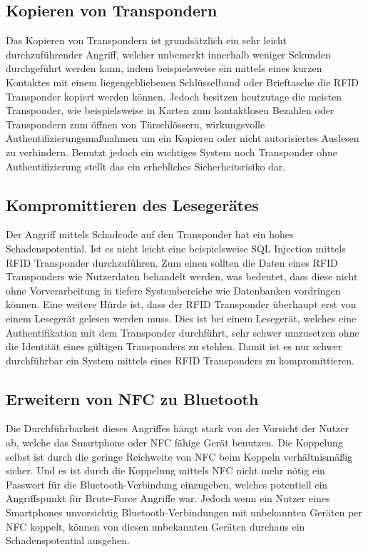 \documentclass[conference]{IEEEtran}
\begin{document}
\subsection{Kopieren von Transpondern}
Das Kopieren von Transpondern ist grundsätzlich ein sehr leicht durchzuführender Angriff, welcher unbemerkt innerhalb weniger Sekunden durchgeführt werden kann, indem beispielsweise ein mittels eines kurzen Kontaktes mit einem liegengebliebenen Schlüsselbund oder Brieftasche die RFID Transponder kopiert werden können. Jedoch besitzen heutzutage die meisten Transponder, wie beispielsweise in Karten zum kontaktlosen Bezahlen oder Transpondern zum öffnen von Türschlössern, wirkungsvolle Authentifizierungsmaßnahmen um ein Kopieren oder nicht autorisiertes Auslesen zu verhindern. Benutzt jedoch ein wichtiges System noch Transponder ohne Authentifizierung stellt das ein erhebliches Sicherheitsrisiko dar.

\subsection{Kompromittieren des Lesegerätes}
Der Angriff mittels Schadcode auf den Transponder hat ein hohes Schadenspotential. Ist es nicht leicht eine beispielsweise SQL Injection mittels RFID Transponder durchzuführen. Zum einen sollten die Daten eines RFID Transponders wie Nutzerdaten behandelt werden, was bedeutet, dass diese nicht ohne Vorverarbeitung in tiefere Systembereiche wie Datenbanken vordringen können. Eine weitere Hürde ist, dass der RFID Transponder überhaupt erst von einem Lesegerät gelesen werden muss. Dies ist bei einem Lesegerät, welches eine Authentifikation mit dem Transponder durchführt, sehr schwer umzusetzen ohne die Identität eines gültigen Transponders zu stehlen. Damit ist es nur schwer durchführbar ein System mittels eines RFID Transponders zu kompromittieren.

\subsection{Erweitern von NFC zu Bluetooth}
Die Durchführbarkeit dieses Angriffes hängt stark von der Vorsicht der Nutzer ab, welche das Smartphone oder NFC fähige Gerät benutzen. Die Koppelung selbst ist durch die geringe Reichweite von NFC beim Koppeln verhältnismäßig sicher. Und es ist durch die Koppelung mittels NFC nicht mehr nötig ein Passwort für die Bluetooth-Verbindung einzugeben, welches potentiell ein Angriffspunkt für Brute-Force Angriffe war. Jedoch wenn ein Nutzer eines Smartphones unvorsichtig Bluetooth-Verbindungen mit unbekannten Geräten per NFC koppelt, können von diesen unbekannten Geräten durchaus ein Schadenspotential ausgehen.
\end{document}
